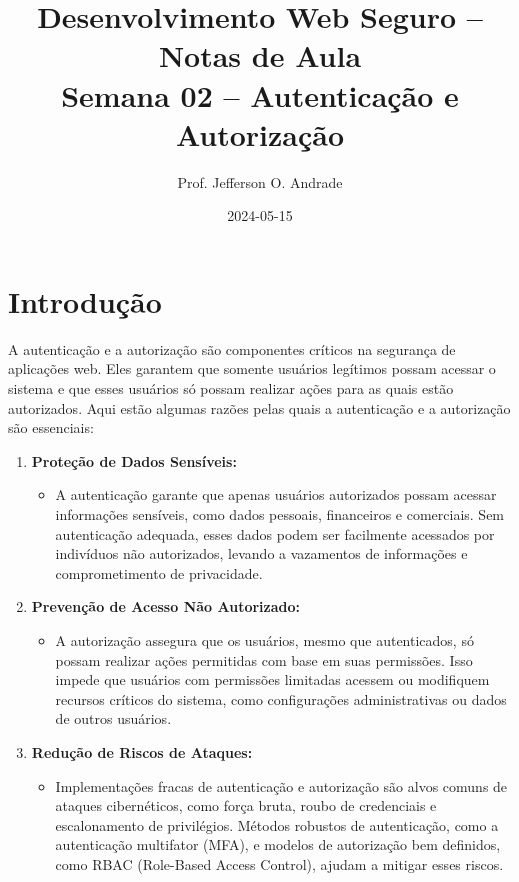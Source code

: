 \documentclass{scrartcl}
\author{Prof. Jefferson O. Andrade}
\date{2024-05-15}
\title{Desenvolvimento Web Seguro -- Notas de Aula\\\medskip
\large Semana 02 -- Autenticação e Autorização}
\begin{document}
\maketitle
\setcounter{tocdepth}{2}
\tableofcontents


\section{Introdução}
\label{sec:orgf5f04a1}

A autenticação e a autorização são componentes críticos na segurança de
aplicações web. Eles garantem que somente usuários legítimos possam acessar o
sistema e que esses usuários só possam realizar ações para as quais estão
autorizados. Aqui estão algumas razões pelas quais a autenticação e a
autorização são essenciais:

\begin{enumerate}
\item \textbf{\textbf{Proteção de Dados Sensíveis:}}
\begin{itemize}
\item A autenticação garante que apenas usuários autorizados possam acessar
informações sensíveis, como dados pessoais, financeiros e comerciais. Sem
autenticação adequada, esses dados podem ser facilmente acessados por
indivíduos não autorizados, levando a vazamentos de informações e
comprometimento de privacidade.
\end{itemize}

\item \textbf{\textbf{Prevenção de Acesso Não Autorizado:}}
\begin{itemize}
\item A autorização assegura que os usuários, mesmo que autenticados, só possam
realizar ações permitidas com base em suas permissões. Isso impede que
usuários com permissões limitadas acessem ou modifiquem recursos críticos
do sistema, como configurações administrativas ou dados de outros usuários.
\end{itemize}

\item \textbf{\textbf{Redução de Riscos de Ataques:}}
\begin{itemize}
\item Implementações fracas de autenticação e autorização são alvos comuns de
ataques cibernéticos, como força bruta, roubo de credenciais e
escalonamento de privilégios. Métodos robustos de autenticação, como a
autenticação multifator (MFA), e modelos de autorização bem definidos, como
RBAC (Role-Based Access Control), ajudam a mitigar esses riscos.
\end{itemize}


\end{enumerate}
\end{document}
